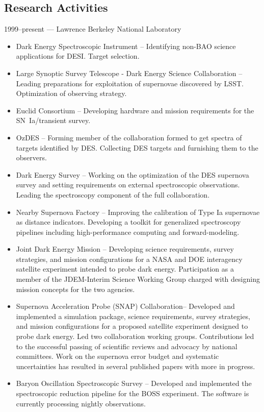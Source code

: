 \documentclass[line, margin]{res}
\begin{document}
\begin{resume}
\section{Research Activities}
1999--present --- Lawrence Berkeley National Laboratory
\begin{itemize}
\item Dark Energy Spectroscopic Instrument -- Identifying non-BAO science applications for DESI.   Target selection. 
\item Large Synoptic Survey Telescope - Dark Energy Science Collaboration -- Leading preparations for 
exploitation of supernovae discovered by LSST.  Optimization of observing strategy.
\item Euclid Consortium -- Developing hardware and mission requirements for the SN~Ia/transient survey.
\item OzDES -- Forming member of the collaboration formed to get spectra of targets identified by DES.  Collecting
DES targets and furnishing them to the observers.
\item Dark Energy Survey -- Working on the optimization of the DES supernova survey and setting requirements
on external spectroscopic observations. Leading the spectroscopy component of the full collaboration.
\item Nearby Supernova Factory -- Improving the calibration of Type Ia supernovae as distance indicators.  Developing
a toolkit for generalized spectroscopy pipelines including high-performance computing and forward-modeling.
\item Joint Dark Energy Mission -- Developing science requirements, survey strategies, and mission configurations for
a NASA and DOE interagency satellite experiment intended to probe dark energy.  Participation as a member of the JDEM-Interim
Science Working Group charged with designing mission concepts for the two agencies.
\item Supernova Acceleration Probe (SNAP) Collaboration-- Developed and implemented a simulation package,
science requirements, survey strategies, and mission configurations for a proposed satellite experiment designed to probe dark energy.
Led two collaboration working groups.  Contributions led to the successful passing of scientific reviews and advocacy by
national committees.  Work on the supernova error budget and systematic uncertainties has resulted in several published papers with
more in progress.
\item Baryon Oscillation Spectroscopic Survey -- Developed and implemented the spectroscopic reduction pipeline for the BOSS experiment.  The software is currently processing nightly observations.

\end{itemize}
\end{resume}
\end{document}
